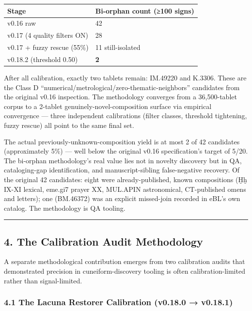 \documentclass[
  11pt,
  letterpaper,
]{article}
\newcounter{none} %
\begin{document}
{\def\LTcaptype{none} %
\begin{longtable}[]{@{}ll@{}}
\toprule\noalign{}
Stage & Bi-orphan count (≥100 signs) \\
\midrule\noalign{}
\endhead
\bottomrule\noalign{}
\endlastfoot
v0.16 raw & 42 \\
v0.17 (4 quality filters ON) & 28 \\
v0.17 + fuzzy rescue (55\%) & 11 still-isolated \\
v0.18.2 (threshold 0.50) & \textbf{2} \\
\end{longtable}
}

After all calibration, exactly two tablets remain: IM.49220 and K.3306.
These are the Class D ``numerical/metrological/zero-thematic-neighbors''
candidates from the original v0.16 inspection. The methodology converges
from a 36,500-tablet corpus to a 2-tablet genuinely-novel-composition
surface via empirical convergence --- three independent calibrations
(filter classes, threshold tightening, fuzzy rescue) all point to the
same final set.

The actual previously-unknown-composition yield is at most 2 of 42
candidates (approximately 5\%) --- well below the original v0.16
specification's target of 5/20. The bi-orphan methodology's real value
lies not in novelty discovery but in QA, cataloging-gap identification,
and manuscript-sibling false-negative recovery. Of the original 42
candidates: eight were already-published, known compositions (Ḫḫ IX-XI
lexical, eme.gi7 prayer XX, MUL.APIN astronomical, CT-published omens
and letters); one (BM.46372) was an explicit missed-join recorded in
eBL's own catalog. The methodology is QA tooling.

\begin{center}\rule{0.5\linewidth}{0.5pt}\end{center}

\subsection{4. The Calibration Audit
Methodology}\label{the-calibration-audit-methodology}

A separate methodological contribution emerges from two calibration
audits that demonstrated precision in cuneiform-discovery tooling is
often calibration-limited rather than signal-limited.

\subsubsection{4.1 The Lacuna Restorer Calibration (v0.18.0 →
v0.18.1)}\label{the-lacuna-restorer-calibration-v0.18.0-v0.18.1}
\end{document}
